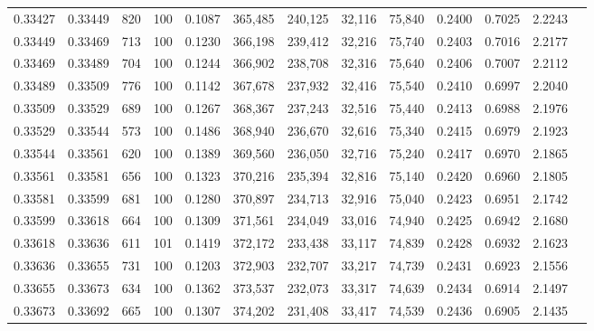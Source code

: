 \begin{tabular}{rrrrrrrrrrrrr}
0.33427 & 0.33449 &   820 & 100 &                                     0.1087 & 365,485 & 240,125 &  32,116 &  75,840 & 0.2400 & 0.7025 & 2.2243 \\
0.33449 & 0.33469 &   713 & 100 &                                     0.1230 & 366,198 & 239,412 &  32,216 &  75,740 & 0.2403 & 0.7016 & 2.2177 \\
0.33469 & 0.33489 &   704 & 100 &                                     0.1244 & 366,902 & 238,708 &  32,316 &  75,640 & 0.2406 & 0.7007 & 2.2112 \\
0.33489 & 0.33509 &   776 & 100 &                                     0.1142 & 367,678 & 237,932 &  32,416 &  75,540 & 0.2410 & 0.6997 & 2.2040 \\
0.33509 & 0.33529 &   689 & 100 &                                     0.1267 & 368,367 & 237,243 &  32,516 &  75,440 & 0.2413 & 0.6988 & 2.1976 \\
0.33529 & 0.33544 &   573 & 100 &                                     0.1486 & 368,940 & 236,670 &  32,616 &  75,340 & 0.2415 & 0.6979 & 2.1923 \\
0.33544 & 0.33561 &   620 & 100 &                                     0.1389 & 369,560 & 236,050 &  32,716 &  75,240 & 0.2417 & 0.6970 & 2.1865 \\
0.33561 & 0.33581 &   656 & 100 &                                     0.1323 & 370,216 & 235,394 &  32,816 &  75,140 & 0.2420 & 0.6960 & 2.1805 \\
0.33581 & 0.33599 &   681 & 100 &                                     0.1280 & 370,897 & 234,713 &  32,916 &  75,040 & 0.2423 & 0.6951 & 2.1742 \\
0.33599 & 0.33618 &   664 & 100 &                                     0.1309 & 371,561 & 234,049 &  33,016 &  74,940 & 0.2425 & 0.6942 & 2.1680 \\
0.33618 & 0.33636 &   611 & 101 &                                     0.1419 & 372,172 & 233,438 &  33,117 &  74,839 & 0.2428 & 0.6932 & 2.1623 \\
0.33636 & 0.33655 &   731 & 100 &                                     0.1203 & 372,903 & 232,707 &  33,217 &  74,739 & 0.2431 & 0.6923 & 2.1556 \\
0.33655 & 0.33673 &   634 & 100 &                                     0.1362 & 373,537 & 232,073 &  33,317 &  74,639 & 0.2434 & 0.6914 & 2.1497 \\
0.33673 & 0.33692 &   665 & 100 &                                     0.1307 & 374,202 & 231,408 &  33,417 &  74,539 & 0.2436 & 0.6905 & 2.1435 \\

\end{tabular}
